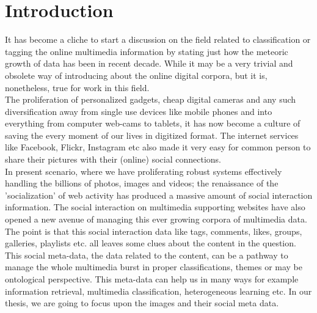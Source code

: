\chapter{Introduction} %
\label{INTR} %
It has become a cliche to start a discussion on the field related to classification or tagging the online multimedia information by stating just how the meteoric growth of data has been in recent decade. While it may be a very trivial and obsolete way of introducing about the online digital corpora, but it is, nonetheless, true for work in this field.\\
\hspace*{1cm}The proliferation of personalized gadgets, cheap digital cameras and any such diversification away from single use devices like mobile phones and into everything from computer web-cams to tablets, it has now become a culture of saving the every moment of our lives in digitized format. The internet services like Facebook, Flickr, Instagram etc also made it very easy for common person to share their pictures with their (online) social connections.\\
\hspace*{1cm}In present scenario, where we have proliferating robust systems effectively handling the billions of photos, images and videos; the renaissance of the 'socialization' of web activity has produced a massive amount of social interaction information. The social interaction on multimedia supporting websites have also opened a new avenue of managing this ever growing corpora of multimedia data. The point is that this social interaction data like tags, comments, likes, groups, galleries, playlists etc. all leaves some clues about the content in the question.\\
\hspace*{1cm}This social meta-data, the data related to the content, can be a pathway to manage the whole multimedia burst in proper classifications, themes  or may be ontological perspective. This meta-data can help us in many ways for example information retrieval, multimedia classification, heterogeneous learning etc. In our thesis, we are going to focus upon the images and their social meta data.\\
